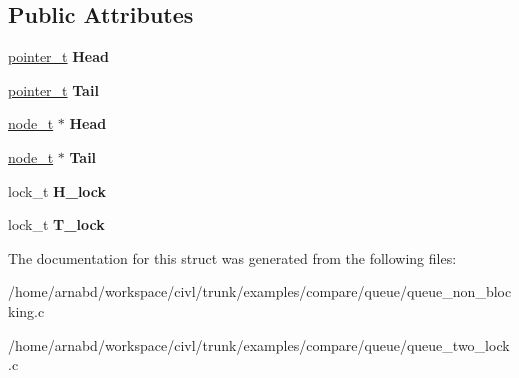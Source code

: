 \subsection*{Public Attributes}
\begin{DoxyCompactItemize}
\item 
\hypertarget{structqueue__t_aadb19f2a9a5ddba536c135806e7c2815}{}\hyperlink{structpointer__t}{pointer\+\_\+t} {\bfseries Head}\label{structqueue__t_aadb19f2a9a5ddba536c135806e7c2815}

\item 
\hypertarget{structqueue__t_ab17a56c0a3d26b683d6d3883fe3718e6}{}\hyperlink{structpointer__t}{pointer\+\_\+t} {\bfseries Tail}\label{structqueue__t_ab17a56c0a3d26b683d6d3883fe3718e6}

\item 
\hypertarget{structqueue__t_a27fc8a718ceb2890dbe4270e5ae33ae2}{}\hyperlink{structnode__t}{node\+\_\+t} $\ast$ {\bfseries Head}\label{structqueue__t_a27fc8a718ceb2890dbe4270e5ae33ae2}

\item 
\hypertarget{structqueue__t_a8bde9412a877b795d242ec30d6e52402}{}\hyperlink{structnode__t}{node\+\_\+t} $\ast$ {\bfseries Tail}\label{structqueue__t_a8bde9412a877b795d242ec30d6e52402}

\item 
\hypertarget{structqueue__t_a05c3f381cb831b816aa3680fb88b5602}{}lock\+\_\+t {\bfseries H\+\_\+lock}\label{structqueue__t_a05c3f381cb831b816aa3680fb88b5602}

\item 
\hypertarget{structqueue__t_aff1b9ffb2a6edcad9f78c342ed19ee02}{}lock\+\_\+t {\bfseries T\+\_\+lock}\label{structqueue__t_aff1b9ffb2a6edcad9f78c342ed19ee02}

\end{DoxyCompactItemize}


The documentation for this struct was generated from the following files\+:\begin{DoxyCompactItemize}
\item 
/home/arnabd/workspace/civl/trunk/examples/compare/queue/queue\+\_\+non\+\_\+blocking.\+c\item 
/home/arnabd/workspace/civl/trunk/examples/compare/queue/queue\+\_\+two\+\_\+lock.\+c\end{DoxyCompactItemize}
